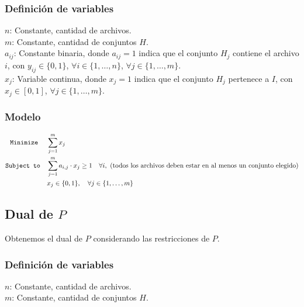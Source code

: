 \documentclass[11pt, a4paper, pdftex]{article}
\begin{document}
\subsubsection{Definición de variables}

\noindent $n$: Constante, cantidad de archivos. \\

\noindent $m$: Constante, cantidad de conjuntos $H$. \\

\noindent $a_{ij}$: Constante binaria, donde $a_{ij} = 1$ indica que el conjunto $H_{j}$ contiene el archivo $i$, con $y_{ij} \in \{0, 1\}$, $\forall i \in \{1, \ldots, n\}$, $\forall j \in \{1, \ldots, m\}$. \\

\noindent $x_{j}$: Variable continua, donde $x_{j} = 1$ indica que el conjunto $H_{j}$ pertenece a $I$, con $x_{j} \in [0, 1]$, $\forall j \in \{1, \ldots, m\}$. \\


\subsubsection{Modelo}

\begin{alignat*}{2}
    \texttt{Minimize}\quad\,\, & \sum_{j = 1}^{m} x_{j}\\
    \texttt{Subject to}\quad   & \sum_{j=1}^{m} a_{i,j} \cdot x_j \geq 1 \quad \forall i,\ \text{(todos los archivos deben estar en al menos un conjunto elegido)}\\
              & x_{j} \in \{0,1\}, \quad \forall j \in \{1, \ldots, m\} \\
\end{alignat*}

\subsection{Dual de $P$}

Obtenemos el dual de $P$ considerando las restricciones de $P$.

\subsubsection{Definición de variables}

\noindent $n$: Constante, cantidad de archivos. \\

\noindent $m$: Constante, cantidad de conjuntos $H$. \\
\end{document}
